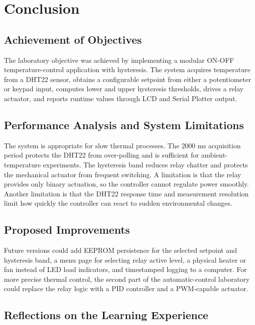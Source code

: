 \section{Conclusion}

\subsection{Achievement of Objectives}

The laboratory objective was achieved by implementing a modular ON-OFF temperature-control application with hysteresis. The system acquires temperature from a DHT22 sensor, obtains a configurable setpoint from either a potentiometer or keypad input, computes lower and upper hysteresis thresholds, drives a relay actuator, and reports runtime values through LCD and Serial Plotter output.

\subsection{Performance Analysis and System Limitations}

The system is appropriate for slow thermal processes. The 2000 ms acquisition period protects the DHT22 from over-polling and is sufficient for ambient-temperature experiments. The hysteresis band reduces relay chatter and protects the mechanical actuator from frequent switching. A limitation is that the relay provides only binary actuation, so the controller cannot regulate power smoothly. Another limitation is that the DHT22 response time and measurement resolution limit how quickly the controller can react to sudden environmental changes.

\subsection{Proposed Improvements}

Future versions could add EEPROM persistence for the selected setpoint and hysteresis band, a menu page for selecting relay active level, a physical heater or fan instead of LED load indicators, and timestamped logging to a computer. For more precise thermal control, the second part of the automatic-control laboratory could replace the relay logic with a PID controller and a PWM-capable actuator.

\subsection{Reflections on the Learning Experience}

